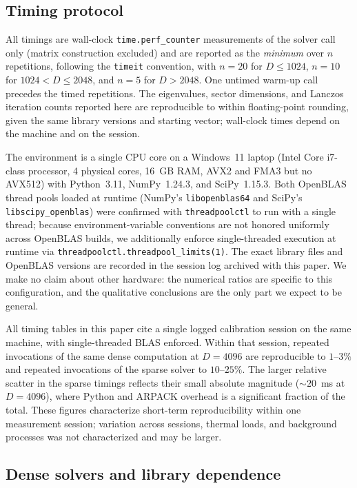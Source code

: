 \documentclass[pdflatex,sn-mathphys-num]{sn-jnl}
\begin{document}
\subsection{Timing protocol}
\label{sec:timing-protocol}

All timings are wall-clock \texttt{time.perf\_counter} measurements
of the solver call only (matrix construction excluded) and are
reported as the \emph{minimum} over $n$ repetitions, following the
\texttt{timeit} convention, with $n=20$ for $D \le 1024$, $n=10$ for
$1024 < D \le 2048$, and $n=5$ for $D > 2048$. One untimed warm-up
call precedes the timed repetitions. The eigenvalues, sector
dimensions, and Lanczos iteration counts reported here are
reproducible to within floating-point rounding, given the same
library versions and starting vector; wall-clock times depend on the
machine and on the session.

The environment is a single CPU core on a Windows~11 laptop
(Intel Core i7-class processor, 4 physical cores, 16~GB RAM, AVX2
and FMA3 but no AVX512) with Python~3.11, NumPy~1.24.3, and
SciPy~1.15.3. Both OpenBLAS thread pools loaded at runtime (NumPy's
\texttt{libopenblas64} and SciPy's \texttt{libscipy\_openblas}) were
confirmed with \texttt{threadpoolctl} to run with a single thread;
because environment-variable conventions are not honored uniformly
across OpenBLAS builds, we additionally enforce single-threaded
execution at runtime via \texttt{threadpoolctl.threadpool\_limits(1)}.
The exact library files and OpenBLAS versions are recorded in the
session log archived with this paper. We make no claim about other
hardware: the numerical ratios are specific to this configuration,
and the qualitative conclusions are the only part we expect to be
general.

All timing tables in this paper cite a single logged calibration
session on the same machine, with single-threaded BLAS enforced.
Within that session, repeated invocations of the same dense
computation at $D=4096$ are reproducible to $1$--$3\%$ and repeated
invocations of the sparse solver to $10$--$25\%$. The larger
relative scatter in the sparse timings reflects their small absolute
magnitude ($\sim 20$~ms at $D=4096$), where Python and ARPACK
overhead is a significant fraction of the total. These figures
characterize short-term reproducibility within one measurement
session; variation across sessions, thermal loads, and background
processes was not characterized and may be larger.

\subsection{Dense solvers and library dependence}
\label{sec:libraries}
\end{document}
